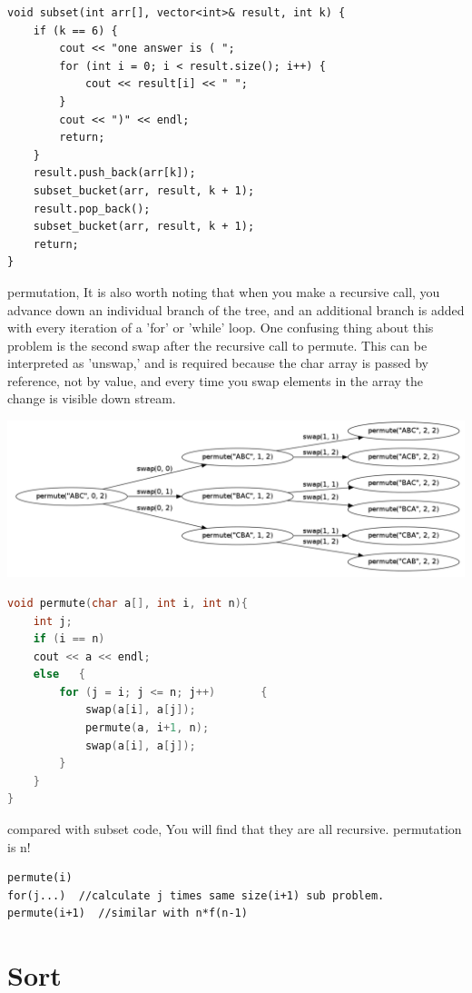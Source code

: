 \documentclass[a4paper,11pt,twoside]{book}
\begin{document}
	
	
\begin{lstlisting}
void subset(int arr[], vector<int>& result, int k) {
	if (k == 6) {
		cout << "one answer is ( ";
		for (int i = 0; i < result.size(); i++) {
			cout << result[i] << " ";
		}
		cout << ")" << endl;
		return;
	}
	result.push_back(arr[k]);
	subset_bucket(arr, result, k + 1);
	result.pop_back();
	subset_bucket(arr, result, k + 1);
	return;
}	
\end{lstlisting}

	\par permutation, It is also worth noting that when you make a recursive call, you advance down an individual branch of the tree, and an additional branch is added with every iteration of a 'for' or 'while' loop. One confusing thing about this problem is the second swap after the recursive call to permute. This can be interpreted as 'unswap,' and is required because the char array is passed by reference, not by value, and every time you swap elements in the array the change is visible down stream.

\begin{center}
	\includegraphics[scale=0.25]{pics/permutation.png}
\end{center}


\begin{lstlisting}[frame=single, language=c++]
void permute(char a[], int i, int n){
	int j;
	if (i == n)
	cout << a << endl;
	else   {
		for (j = i; j <= n; j++)       {
			swap(a[i], a[j]);          
			permute(a, i+1, n);
			swap(a[i], a[j]);
		}
	}
} 		
\end{lstlisting}

	\par compared with subset code, You will find that they are all recursive. permutation is n!
\begin{lstlisting}
permute(i)
for(j...)  //calculate j times same size(i+1) sub problem.
permute(i+1)  //similar with n*f(n-1)		
\end{lstlisting}


\section{Sort}
\end{document}
